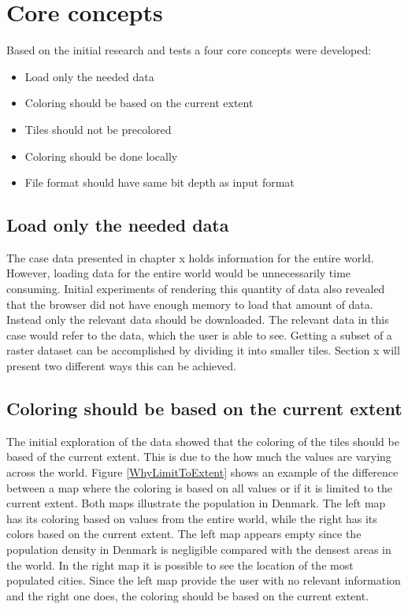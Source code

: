 \section{Core concepts}

Based on the initial research and tests a four core concepts were developed:
\begin{itemize}
	\item Load only the needed data
	\item Coloring should be based on the current extent
	\item Tiles should not be precolored
	\item Coloring should be done locally
	\item File format should have same bit depth as input format
\end{itemize}


\subsection{Load only the needed data}
The case data presented in chapter x holds information for the entire world. However, loading data for the entire world would be unnecessarily time consuming. Initial experiments of rendering this quantity of data also revealed that the browser did not have enough memory to load that amount of data. Instead only the relevant data should be downloaded. The relevant data in this case would refer to the data, which the user is able to see. Getting a subset of a raster dataset can be accomplished by dividing it into smaller tiles. Section x will present two different ways this can be achieved. 

\subsection{Coloring should be based on the current extent}
The initial exploration of the data showed that the coloring of the tiles should be based of the current extent. This is due to the how much the values are varying across the world. Figure \ref{WhyLimitToExtent} shows an example of the difference between a map where the coloring is based on all values or if it is limited to the current extent. Both maps illustrate the population in Denmark. The left map has its coloring based on values from the entire world, while the right has its colors based on the current extent. The left map appears empty since the population density in Denmark is negligible compared with the densest areas in the world. In the right map it is possible to see the location of the most populated cities. Since the left map provide the user with no relevant information and the right one does, the coloring should be based on the current extent.


